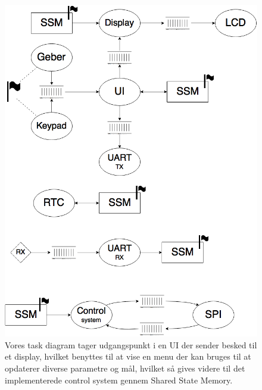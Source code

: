 \begin{figure}[h]
	\begin{center}
		\includegraphics[scale=0.35]{Billeder/Taskdiagram.png}
	\end{center}
\label{fig:taskdiagram}
\caption{Vores task diagram tager udgangspunkt i en UI der sender besked til et display, hvilket benyttes til at vise en menu der kan bruges til at opdaterer diverse parametre og mål, hvilket så gives videre til det implementerede control system gennem Shared State Memory.}
\end{figure}
